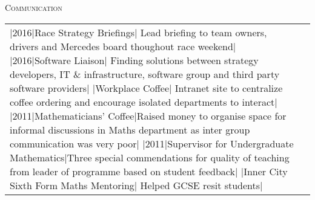 \documentclass[a4paper,10pt]{article}
\newcommand{\lineunder}{\vspace*{0.2cm} \\ \hspace*{-20pt} \hrulefill \\ \vspace{-0.9cm}}
\newcommand{\header}[1]{{\hspace*{-17pt}\vspace*{6pt} \large{\textsc{#1}}}}
\newenvironment{cvsection}[1][]%
{%
  \header{#1}

  \begin{tabular}{p{0.8in}p{5.3in}}
}
{
  \end{tabular}
  \newline
  \lineunder
}
\begin{document}

\begin{cvsection}[Communication]
  \R 2014|2016|Race Strategy Briefings| Lead briefing to team owners, drivers
  and Mercedes board thoughout race weekend|
  \R 2010|2016|Software Liaison| Finding solutions between strategy developers,
  IT \& infrastructure, software group and third party software providers|
  \Rs 2011|Workplace Coffee| Intranet site to centralize coffee ordering and
  encourage isolated departments to interact|
  \R 2010|2011|Mathematicians' Coffee|Raised money to organise space for informal discussions in
  Maths department as inter group communication was very poor|
  \R 2008|2011|Supervisor for Undergraduate Mathematics|Three special
  commendations for quality of teaching from leader of programme based on
  student feedback|
  \Rs 2008|Inner City Sixth Form Maths Mentoring| Helped GCSE resit students|
\end{cvsection}
\end{document}
